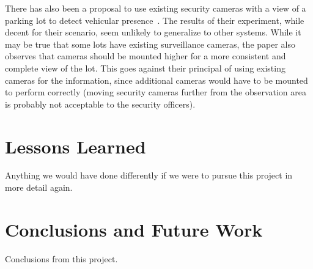 \documentclass{acm_proc}
\begin{document}
There has also been a proposal to use existing security cameras with a view
of a parking lot to detect vehicular presence~\cite{lin:vision-parking}.
The results of their experiment, while decent for their scenario, seem
unlikely to generalize to other systems.
While it may be true that some lots have existing surveillance cameras, the
paper also observes that cameras should be mounted higher for a more
consistent and complete view of the lot.
This goes against their principal of using existing cameras for the
information, since additional cameras would have to be mounted to perform
correctly (moving security cameras further from the observation area is
probably not acceptable to the security officers).

\section{Lessons Learned}\label{sec:lessons}

Anything we would have done differently if we were to pursue this project
in more detail again.

\section{Conclusions and Future Work}\label{sec:conclusions}

Conclusions from this project.



\end{document}
